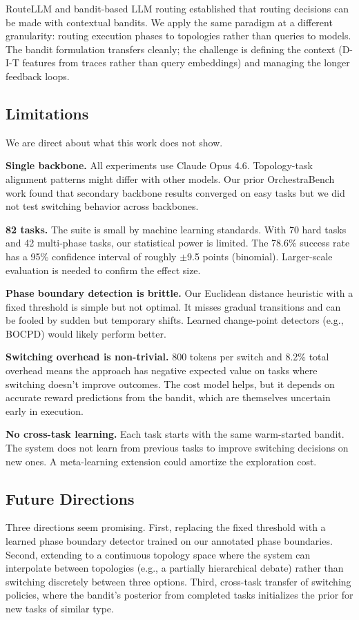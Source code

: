 RouteLLM \citep{routellm_2025} and bandit-based LLM routing
\citep{banditllm_2025} established that routing decisions can be made
with contextual bandits. We apply the same paradigm at a different
granularity: routing execution phases to topologies rather than queries
to models. The bandit formulation transfers cleanly; the challenge is
defining the context (D-I-T features from traces rather than query
embeddings) and managing the longer feedback loops.

\subsection{Limitations}\label{limitations}

We are direct about what this work does not show.

\textbf{Single backbone.} All experiments use Claude Opus 4.6.
Topology-task alignment patterns might differ with other models. Our
prior OrchestraBench work found that secondary backbone results
converged on easy tasks but we did not test switching behavior across
backbones.

\textbf{82 tasks.} The suite is small by machine learning standards.
With 70 hard tasks and 42 multi-phase tasks, our statistical power is
limited. The 78.6\% success rate has a 95\% confidence interval of
roughly $\pm$9.5 points (binomial). Larger-scale evaluation is needed
to confirm the effect size.

\textbf{Phase boundary detection is brittle.} Our Euclidean distance
heuristic with a fixed threshold is simple but not optimal. It misses
gradual transitions and can be fooled by sudden but temporary shifts.
Learned change-point detectors (e.g., BOCPD) would likely perform
better.

\textbf{Switching overhead is non-trivial.} 800 tokens per switch and
8.2\% total overhead means the approach has negative expected value on
tasks where switching doesn't improve outcomes. The cost model helps,
but it depends on accurate reward predictions from the bandit, which are
themselves uncertain early in execution.

\textbf{No cross-task learning.} Each task starts with the same
warm-started bandit. The system does not learn from previous tasks to
improve switching decisions on new ones. A meta-learning extension could
amortize the exploration cost.

\subsection{Future Directions}\label{future-directions}

Three directions seem promising. First, replacing the fixed threshold
with a learned phase boundary detector trained on our annotated phase
boundaries. Second, extending to a continuous topology space where the
system can interpolate between topologies (e.g., a partially
hierarchical debate) rather than switching discretely between three
options. Third, cross-task transfer of switching policies, where the
bandit's posterior from completed tasks initializes the prior for new
tasks of similar type.
